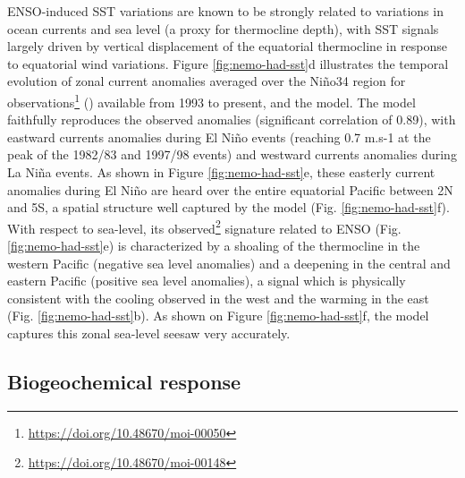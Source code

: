 ENSO-induced SST variations are known to be strongly related to variations in ocean currents and sea level (a proxy for thermocline depth), with SST signals largely driven by vertical displacement of the equatorial thermocline in response to equatorial wind variations. Figure \ref{fig:nemo-had-sst}d illustrates the temporal evolution of zonal current anomalies averaged over the Niño34 region for observations\footnote{\url{https://doi.org/10.48670/moi-00050}} (\citealp{rioGOCEOceanCirculation2014}) available from 1993 to present, and the model. The model faithfully reproduces the observed anomalies (significant correlation of 0.89), with eastward currents anomalies during El Niño events (reaching 0.7 m.s-1 at the peak of the 1982/83 and 1997/98 events) and westward currents anomalies during La Niña events. As shown in Figure \ref{fig:nemo-had-sst}e, these easterly current anomalies during El Niño are heard over the entire equatorial Pacific between 2N and 5S, a spatial structure well captured by the model (Fig. \ref{fig:nemo-had-sst}f).
With respect to sea-level, its observed\footnote{\url{https://doi.org/10.48670/moi-00148}} signature related to ENSO (Fig. \ref{fig:nemo-had-sst}e) is characterized by a shoaling of the thermocline in the western Pacific (negative sea level anomalies) and a deepening in the central and eastern Pacific (positive sea level anomalies), a signal which is physically consistent with the cooling observed in the west and the warming in the east (Fig. \ref{fig:nemo-had-sst}b). As shown on Figure \ref{fig:nemo-had-sst}f, the model captures this zonal sea-level seesaw very accurately.

\subsection{Biogeochemical response}

